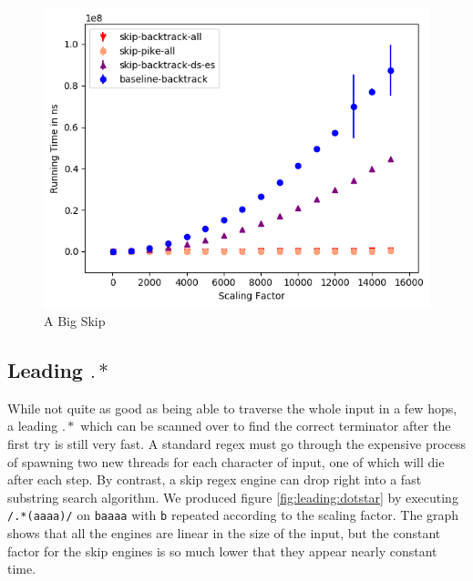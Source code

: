 \begin{figure}
\label{fig:a:big:skip}
\caption{A Big Skip}

\includegraphics{resources/a-big-skip.png}
\end{figure}

\subsection{Leading $.*$}

While not quite as good as being able to traverse the whole input
in a few hops, a leading $.*$ which can be scanned over to find the
correct terminator after the first try is still very fast. A standard
regex must go through the expensive process of spawning two new threads
for each character of input, one of which will die after each step.
By contrast, a skip regex engine can drop right into a fast substring
search algorithm. We produced figure \ref{fig:leading:dotstar} by executing
\verb'/.*(aaaa)/' on \verb'baaaa' with \verb'b' repeated according
to the scaling factor. The graph shows that all the engines are linear
in the size of the input, but the constant factor for the skip engines
is so much lower that they appear nearly constant time.

